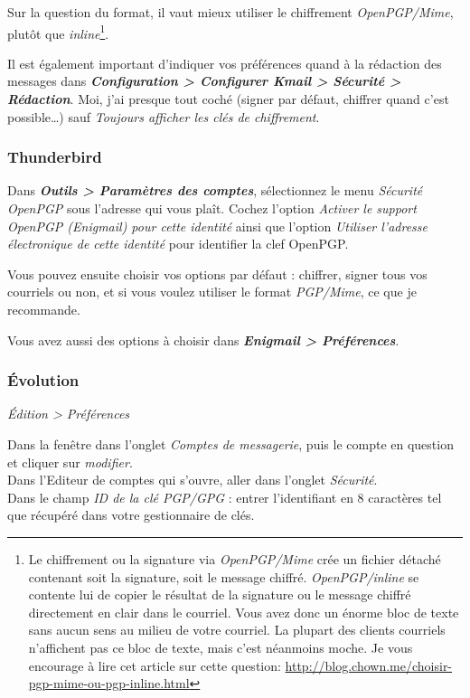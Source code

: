 Sur la question du format, il vaut mieux utiliser le chiffrement \emph{OpenPGP/Mime}, plutôt que
\emph{inline}\footnote{Le chiffrement ou la signature via \emph{OpenPGP/Mime} crée un fichier détaché contenant soit la signature, soit le message chiffré.
	\emph{OpenPGP/inline} se contente lui de copier le résultat de la signature ou le message chiffré directement en clair dans le courriel.
	Vous avez donc un énorme bloc de texte sans aucun sens au milieu de votre courriel. La plupart des clients courriels n'affichent pas ce bloc de texte, mais c'est néanmoins moche. Je vous encourage à lire cet article sur cette question: \url{http://blog.chown.me/choisir-pgp-mime-ou-pgp-inline.html}}.

Il est également important d'indiquer vos préférences quand à la
rédaction des messages dans \textbf{\emph{Configuration \textgreater{}
Configurer Kmail \textgreater{} Sécurité \textgreater{} Rédaction}}.
Moi, j'ai presque tout coché (signer par défaut, chiffrer quand c'est
possible\ldots{}) sauf \emph{Toujours afficher les clés de chiffrement}.

\subsubsection{Thunderbird}\label{thunderbird}

Dans \textbf{\emph{Outils \textgreater{} Paramètres des comptes}},
sélectionnez le menu \emph{Sécurité OpenPGP} sous l'adresse qui vous
plaît. Cochez l'option \emph{Activer le support OpenPGP (Enigmail) pour
cette identité} ainsi que l'option \emph{Utiliser l'adresse électronique
de cette identité} pour identifier la clef OpenPGP.

Vous pouvez ensuite choisir vos options par défaut : chiffrer, signer
tous vos courriels ou non, et si vous voulez utiliser le format
\emph{PGP/Mime}, ce que je recommande.

Vous avez aussi des options à choisir dans \textbf{\emph{Enigmail
\textgreater{} Préférences}}.

\subsubsection{Évolution}\label{uxe9volution}

\emph{Édition \textgreater{} Préférences}

Dans la fenêtre dans l'onglet \emph{Comptes de messagerie}, puis le
compte en question et cliquer sur \emph{modifier}.\\Dans l'Editeur de
comptes qui s'ouvre, aller dans l'onglet \emph{Sécurité}.\\Dans le champ
\emph{ID de la clé PGP/GPG} : entrer l'identifiant en 8 caractères tel
que récupéré dans votre gestionnaire de clés.

